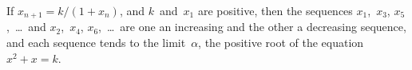 If $x_{n+1} = k/(1 + x_{n})$, and $k$~and~$x_{1}$ are positive, then the sequences
$x_{1}$,~$x_{3}$, $x_{5}$,~\dots\ and $x_{2}$,~$x_{4}$, $x_{6}$,~\dots\ are one an increasing and the other a decreasing
sequence, and each sequence tends to the limit~$\alpha$, the positive root of the
equation $x^{2} + x = k$.

